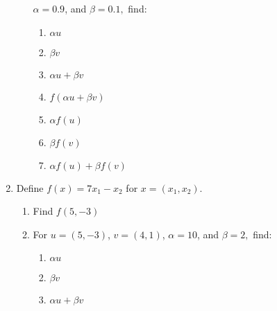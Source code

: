 \documentclass[11pt,fleqn]{article}
\begin{document}
\begin{enumerate}
\begin{multicols}{2}
\begin{enumerate}
		{\Large{ $\alpha=0.9$, and $\beta=0.1,$}} \: find:	
		\begin{enumerate}
		\item $\alpha u$\\
		\vspace{.7in}
		\item $\beta v$\\
		\vspace{.7in}
		\item $\alpha u + \beta v$\\
		
		\vspace{.7in}
		
		\item $f(\alpha u + \beta v)$\\
		
		\vspace{.7in}
		
		\item $\alpha f(u)$\\
		
		\vspace{.7in}
		
		\item $\beta f(v)$\\
		
		\vspace{.7in}
		
		\item $\alpha f(u) + \beta f(v)$\\
		
		\vspace{.7in}
		
		\end{enumerate}
	\end{enumerate}
\end{multicols}
	
\vfill
\newpage
\item Define $f(x)=7x_1-x_2$ for $x=(x_1,x_2).$ 
	\begin{enumerate}
	\item Find $f(5,-3)$\\
	
	\vspace{.5in}
		
	
	\item For $u=(5,-3)$, $v=(4,1)$, $\alpha=10$, and $\beta=2,$ find:	
		\begin{enumerate}
		\item $\alpha u$\\
		\vspace{.7in}
		\item $\beta v$\\
		\vspace{.7in}
		\item $\alpha u + \beta v$\\
		

\end{enumerate}
\end{enumerate}
\end{enumerate}
\end{document}
